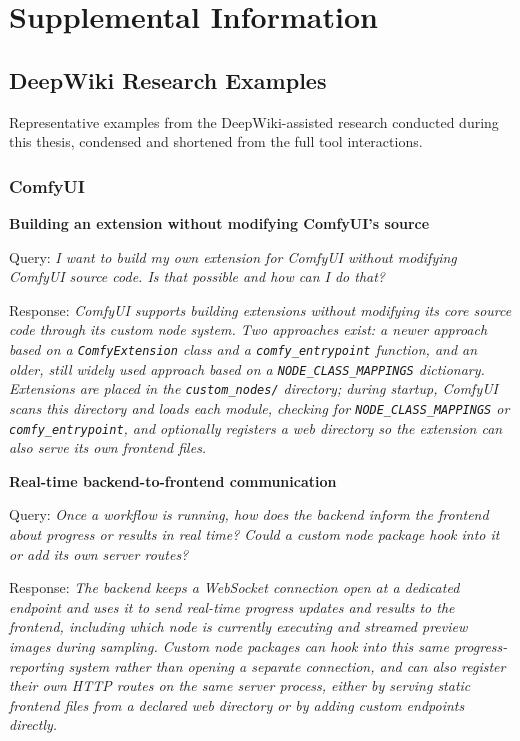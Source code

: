 \chapter{Supplemental Information}\label{app:supplemental-information}

\section{DeepWiki Research Examples}\label{app:1}

Representative examples from the DeepWiki-assisted research conducted during this thesis, condensed and shortened from the full tool interactions.

\subsection{ComfyUI}\label{app:1-comfyui}

\textbf{Building an extension without modifying ComfyUI's source}

Query: \textit{I want to build my own extension for ComfyUI without modifying ComfyUI source code. Is that possible and how can I do that?}

Response: \textit{ComfyUI supports building extensions without modifying its core source code through its custom node system. Two approaches exist: a newer approach based on a \texttt{ComfyExtension} class and a \texttt{comfy\_entrypoint} function, and an older, still widely used approach based on a \texttt{NODE\_CLASS\_MAPPINGS} dictionary. Extensions are placed in the \texttt{custom\_nodes/} directory; during startup, ComfyUI scans this directory and loads each module, checking for \texttt{NODE\_CLASS\_MAPPINGS} or \texttt{comfy\_entrypoint}, and optionally registers a web directory so the extension can also serve its own frontend files.}

\textbf{Real-time backend-to-frontend communication}

Query: \textit{Once a workflow is running, how does the backend inform the frontend about progress or results in real time? Could a custom node package hook into it or add its own server routes?}

Response: \textit{The backend keeps a WebSocket connection open at a dedicated endpoint and uses it to send real-time progress updates and results to the frontend, including which node is currently executing and streamed preview images during sampling. Custom node packages can hook into this same progress-reporting system rather than opening a separate connection, and can also register their own HTTP routes on the same server process, either by serving static frontend files from a declared web directory or by adding custom endpoints directly.}

